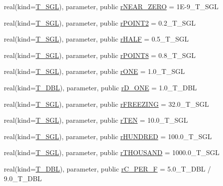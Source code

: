 \begin{DoxyCompactItemize}
\item 
real(kind=\hyperlink{namespacetypes_af3012489af4c138f271f1bce244b7e51}{T\_\-SGL}), parameter, public \hyperlink{namespacetypes_a50c1fa61c229766c2a17cb7687703cdb}{rNEAR\_\-ZERO} = 1E-\/9\_\-T\_\-SGL
\item 
real(kind=\hyperlink{namespacetypes_af3012489af4c138f271f1bce244b7e51}{T\_\-SGL}), parameter, public \hyperlink{namespacetypes_af161d4f0ffc44961986c81a32a2c82a7}{rPOINT2} = 0.2\_\-T\_\-SGL
\item 
real(kind=\hyperlink{namespacetypes_af3012489af4c138f271f1bce244b7e51}{T\_\-SGL}), parameter, public \hyperlink{namespacetypes_a496f566e809e4eaac5c2d3b6138667d1}{rHALF} = 0.5\_\-T\_\-SGL
\item 
real(kind=\hyperlink{namespacetypes_af3012489af4c138f271f1bce244b7e51}{T\_\-SGL}), parameter, public \hyperlink{namespacetypes_a3d2ba56f06a1f0b74066c51ebcfe3454}{rPOINT8} = 0.8\_\-T\_\-SGL
\item 
real(kind=\hyperlink{namespacetypes_af3012489af4c138f271f1bce244b7e51}{T\_\-SGL}), parameter, public \hyperlink{namespacetypes_a94afcebb08a1e89087d5ffb5a7585b72}{rONE} = 1.0\_\-T\_\-SGL
\item 
real(kind=\hyperlink{namespacetypes_a888737411068474a167b1c3e5b579c58}{T\_\-DBL}), parameter, public \hyperlink{namespacetypes_a90dcad5fbd0123e675aed418b5b421cf}{rD\_\-ONE} = 1.0\_\-T\_\-DBL
\item 
real(kind=\hyperlink{namespacetypes_af3012489af4c138f271f1bce244b7e51}{T\_\-SGL}), parameter, public \hyperlink{namespacetypes_a80a8178ea4741071027cb936192002ad}{rFREEZING} = 32.0\_\-T\_\-SGL
\item 
real(kind=\hyperlink{namespacetypes_af3012489af4c138f271f1bce244b7e51}{T\_\-SGL}), parameter, public \hyperlink{namespacetypes_ad2b16166ee54c6521c92846ca1867905}{rTEN} = 10.0\_\-T\_\-SGL
\item 
real(kind=\hyperlink{namespacetypes_af3012489af4c138f271f1bce244b7e51}{T\_\-SGL}), parameter, public \hyperlink{namespacetypes_a97b2b1d206618d3a266b45e582f7ebf3}{rHUNDRED} = 100.0\_\-T\_\-SGL
\item 
real(kind=\hyperlink{namespacetypes_af3012489af4c138f271f1bce244b7e51}{T\_\-SGL}), parameter, public \hyperlink{namespacetypes_a46c52dedd7fb25f5de9fdbd1ce795aaa}{rTHOUSAND} = 1000.0\_\-T\_\-SGL
\item 
real(kind=\hyperlink{namespacetypes_a888737411068474a167b1c3e5b579c58}{T\_\-DBL}), parameter, public \hyperlink{namespacetypes_a5ff46874e183669d28f6a46080ea20b7}{rC\_\-PER\_\-F} = 5.0\_\-T\_\-DBL / 9.0\_\-T\_\-DBL

\end{DoxyCompactItemize}
